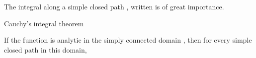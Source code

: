 \begin{EMexample}{}


\end{EMexample}

\begin{EMexample}{}


\end{EMexample}

\begin{EMexample}{}


\end{EMexample}

\begin{EMexample}{}


\end{EMexample}


The integral along a simple closed path , written
is of great importance.

\begin{EMtheorem}{Cauchy's integral theorem}

If the function  is analytic in the simply connected domain , then for every simple closed path  in this domain,

\end{EMtheorem}

